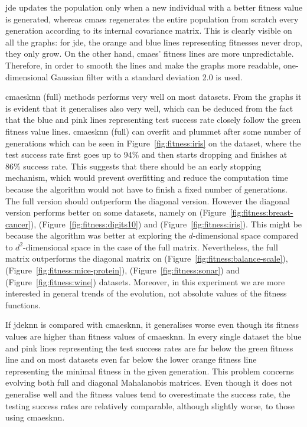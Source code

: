 \documentclass[12pt,a4paper]{report}
\begin{document}
\ac{jde} updates the population only when a new individual with a better fitness value is generated, whereas \ac{cmaes} regenerates the entire population from scratch every generation according to its internal covariance matrix. This is clearly visible on all the graphs: for \ac{jde}, the orange and blue lines representing fitnesses never drop, they only grow. On the other hand, \ac{cmaes}' fitness lines are more unpredictable. Therefore, in order to smooth the lines and make the graphs more readable, one-dimensional Gaussian filter with a standard deviation 2.0 is used.

\ac{cmaesknn} (full) methods performs very well on most datasets. From the graphs it is evident that it generalises also very well, which can be deduced from the fact that the blue and pink lines representing test success rate closely follow the green fitness value lines. \ac{cmaesknn} (full) can overfit and plummet after some number of generations which can be seen in Figure~\ref{fig:fitness:iris} on the  dataset, where the test success rate first goes up to 94\% and then starts dropping and finishes at 86\% success rate. This suggests that there should be an early stopping mechanism, which would prevent overfitting and reduce the computation time because the algorithm would not have to finish a fixed number of generations. The full version should outperform the diagonal version. However the diagonal version performs better on some datasets, namely on  (Figure~\ref{fig:fitness:breast-cancer}),  (Figure~\ref{fig:fitness:digits10}) and  (Figure~\ref{fig:fitness:iris}). This might be because the algorithm was better at exploring the $d$-dimensional space compared to $d^2$-dimensional space in the case of the full matrix. Nevertheless, the full matrix outperforms the diagonal matrix on  (Figure~\ref{fig:fitness:balance-scale}),  (Figure~\ref{fig:fitness:mice-protein}),  (Figure~\ref{fig:fitness:sonar}) and  (Figure~\ref{fig:fitness:wine}) datasets. Moreover, in this experiment we are more interested in general trends of the evolution, not absolute values of the fitness functions.

If \ac{jdeknn} is compared with \ac{cmaesknn}, it generalises worse even though its fitness values are higher than fitness values of \ac{cmaesknn}. In every single dataset the blue and pink lines representing the test success rates are far below the green fitness line and on most datasets even far below the lower orange fitness line representing the minimal fitness in the given generation. This problem concerns evolving both full and diagonal Mahalanobis matrices. Even though it does not generalise well and the fitness values tend to overestimate the success rate, the testing success rates are relatively comparable, although slightly worse, to those using \ac{cmaesknn}.
\end{document}
